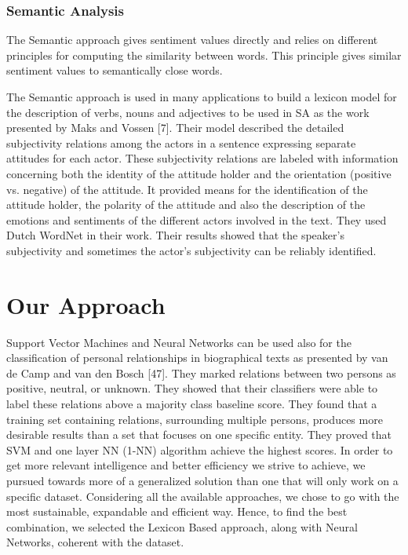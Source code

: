 \subsubsection{Semantic Analysis}
The Semantic approach gives sentiment values directly and relies on different principles for computing the similarity between words. This principle gives similar sentiment values to semantically close words.

The Semantic approach is used in many applications to build a lexicon model for the description of verbs, nouns and adjectives to be used in SA as the work presented by Maks and Vossen [7]. Their model described the detailed subjectivity relations among the actors in a sentence expressing separate attitudes for each actor. These subjectivity relations are labeled with information concerning both the identity of the attitude holder and the orientation (positive vs. negative) of the attitude. It provided means for the identification of the attitude holder, the polarity of the attitude and also the description of the emotions and sentiments of the different actors involved in the text. They used Dutch WordNet in their work. Their results showed that the speaker’s subjectivity and sometimes the actor’s subjectivity can be reliably identified.


\section{Our Approach}
Support Vector Machines and Neural Networks can be used also for the classification of personal relationships in biographical texts as presented by van de Camp and van den Bosch [47]. They marked relations between two persons as positive, neutral, or unknown. They showed that their classifiers were able to label these relations above a majority class baseline score. They found that a training set containing relations, surrounding multiple persons, produces more desirable results than a set that focuses on one specific entity. They proved that SVM and one layer NN (1-NN) algorithm achieve the highest scores.
In order to get more relevant intelligence and better efficiency we strive to achieve, we pursued towards more of a generalized solution than one that will only work on a specific dataset.\newline
Considering all the available approaches, we chose to go with the most sustainable, expandable and efficient way. Hence, to find the best combination, we selected the Lexicon Based approach, along with Neural Networks, coherent with the dataset.